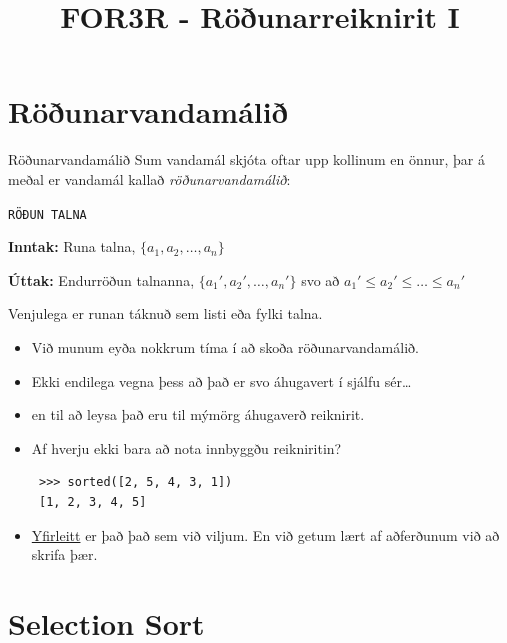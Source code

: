 \documentclass[handout]{beamer}
\title{FOR3R - Röðunarreiknirit I}
\begin{document}
\begin{frame}
\titlepage
\end{frame}

\section{Röðunarvandamálið}

\begin{frame}{Röðunarvandamálið}
Sum vandamál skjóta oftar upp kollinum en önnur, þar á meðal er vandamál kallað \emph{röðunarvandamálið}:

\begin{framed}
\texttt{RÖÐUN TALNA}

\textbf{Inntak:} Runa talna, $\{a_1, a_2, \ldots, a_n\}$

\textbf{Úttak:} Endurröðun talnanna, $\{a_1', a_2', \ldots, a_n'\}$ svo að $a_1' \leq a_2' \leq \ldots \leq a_n'$
\end{framed}

Venjulega er runan táknuð sem listi eða fylki talna.
\end{frame}

\begin{frame}[fragile]
\begin{itemize}
 \item Við munum eyða nokkrum tíma í að skoða röðunarvandamálið.
 \item Ekki endilega vegna þess að það er svo áhugavert í sjálfu sér\ldots
 \pause
 \item en til að leysa það eru til mýmörg áhugaverð reiknirit.
 \pause
 \item Af hverju ekki bara að nota innbyggðu reikniritin?
 \begin{verbatim}
 >>> sorted([2, 5, 4, 3, 1])
 [1, 2, 3, 4, 5]
 \end{verbatim}
 \pause
 \item \href{http://envisage-project.eu/proving-android-java-and-python-sorting-algorithm-is-broken-and-how-to-fix-it/}{Yfirleitt} er það það sem við viljum. En við getum lært af aðferðunum við að skrifa þær.
\end{itemize}
\end{frame}


\section{Selection Sort}
\end{document}
